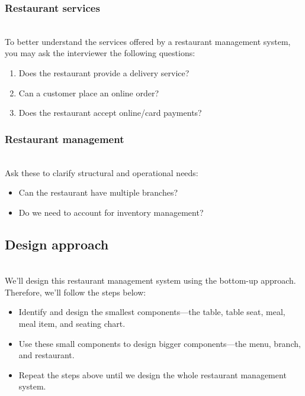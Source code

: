 \subsubsection{Restaurant services}\label{gziQE3vBlg5PeWmHt5RsU}
\\
To better understand the services offered by a restaurant management system, you may ask the interviewer the following questions:

\begin{enumerate}
\item
\protect{}\label{JglEp1o3bPfp8o1B3dCXi}
Does the restaurant provide a delivery service?
\item
\protect{}\label{44zo0ov2hk5PoWK-d1gEC}
Can a customer place an online order?
\item
\protect{}\label{0eyb2KHawyg3zEfGZL6B4}
Does the restaurant accept online/card payments?
\end{enumerate}

\subsubsection{Restaurant management}\label{w85vLBFYtNqodud0mUXJw}
\\
Ask these to clarify structural and operational needs:

\begin{itemize}
\item
\protect{}\label{0VxeFN4q0AUhFxkIjKBhc}
Can the restaurant have multiple branches?
\item
\protect{}\label{rUD4O-2Q6YYa_gh9k0mfM}
Do we need to account for inventory management?
\end{itemize}

\subsection{Design approach}\label{MpNP2-BX-3jSqtP87UF3x}
\\
We'll design this restaurant management system using the bottom-up approach. Therefore, we'll follow the steps below:

\begin{itemize}
\item
\protect{}\label{UIdRwl-OZrAD7XgRBltFf}
Identify and design the smallest components---the table, table seat, meal, meal item, and seating chart.
\item
\protect{}\label{vcdYBTKLnBUQetpogfmLq}
Use these small components to design bigger components---the menu, branch, and restaurant.
\item
\protect{}\label{85L-86xuuinkjVeeoXN0l}
Repeat the steps above until we design the whole restaurant management system.
\end{itemize}

